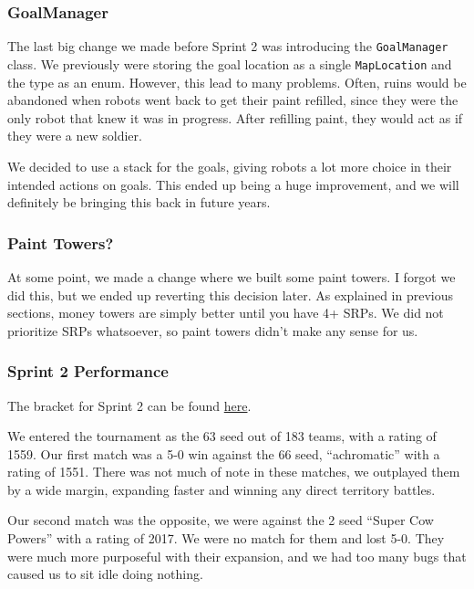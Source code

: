 \subsubsection{GoalManager}

The last big change we made before Sprint 2 was introducing the \verb|GoalManager| class. We previously were storing the goal location as a single \verb|MapLocation| and the type as an enum. However, this lead to many problems. Often, ruins would be abandoned when robots went back to get their paint refilled, since they were the only robot that knew it was in progress. After refilling paint, they would act as if they were a new soldier.

\medskip

We decided to use a stack for the goals, giving robots a lot more choice in their intended actions on goals. This ended up being a huge improvement, and we will definitely be bringing this back in future years.

\subsubsection{Paint Towers?}

At some point, we made a change where we built some paint towers. I forgot we did this, but we ended up reverting this decision later. As explained in previous sections, money towers are simply better until you have 4+ SRPs. We did not prioritize SRPs whatsoever, so paint towers didn't make any sense for us.

\subsubsection{Sprint 2 Performance}

The bracket for Sprint 2 can be found \href{https://challonge.com/bc25javasprint2}{here}.

\medskip

We entered the tournament as the 63 seed out of 183 teams, with a rating of 1559. Our first match was a 5-0 win against the 66 seed, ``achromatic'' with a rating of 1551. There was not much of note in these matches, we outplayed them by a wide margin, expanding faster and winning any direct territory battles.

\medskip

Our second match was the opposite, we were against the 2 seed ``Super Cow Powers'' with a rating of 2017. We were no match for them and lost 5-0. They were much more purposeful with their expansion, and we had too many bugs that caused us to sit idle doing nothing.